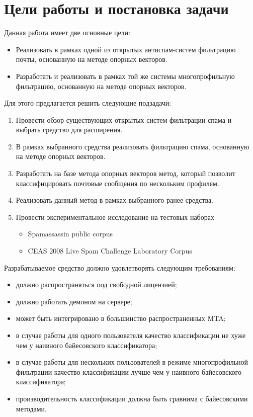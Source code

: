 \newpage
\section{Цели работы и постановка задачи}


Данная работа имеет две основные цели:
\begin{itemize}
\item Реализовать в рамках одной из открытых антиспам-систем фильтрацию почты, основанную на методе опорных векторов.
\item Разработать и реализовать в рамках той же системы многопрофильную фильтрацию, основанную на методе опорных векторов.
\end{itemize}

Для этого предлагается решить следующие подзадачи:
\begin{enumerate}
\item  Провести обзор существующих открытых систем фильтрации спама и выбрать средство для расширения. 
\item В рамках выбранного средства реализовать фильтрацию спама, основанную на методе опорных векторов.
\item Разработать на базе метода опорных векторов метод, который позволит классифицировать почтовые сообщения по нескольким профилям.
\item Реализовать данный метод в рамках выбранного ранее средства.
\item Провести экспериментальное исследование на тестовых наборах
\begin{itemize}
    \item Spamassassin public corpus
    \item CEAS 2008 Live Spam Challenge Laboratory Corpus
\end{itemize}
\end{enumerate}

Разрабатываемое средство должно удовлетворять следующим требованиям:
\begin{itemize}
\item должно распространяться под свободной лицензией;
\item должно работать демоном на сервере;
\item может быть интегрировано в большинство распространенных MTA;
\item в случае работы для одного пользователя качество классификации не хуже чем у наивного байесовского классификатора;
\item в случае работы для нескольких пользователей в режиме многопрофильной фильтрации качество классификации лучше чем у наивного байесовского классификатора;
\item производительность классификации должна быть сравнима с байесовскими методами.
\end{itemize}
